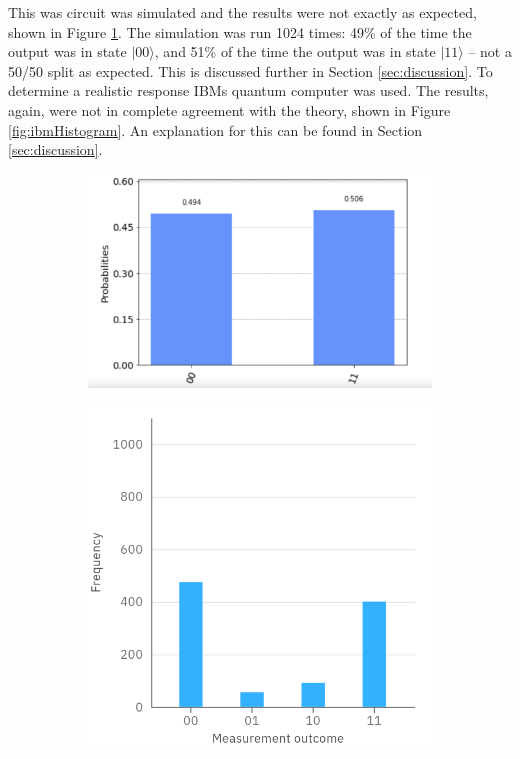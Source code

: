 This was circuit was simulated and the results were not exactly as expected, shown in Figure \ref{fig:qiskitHistogram}. The simulation was run 1024 times: 49\% of the time the output was in state $|00\rangle$, and 51\% of the time the output was in state $|11\rangle$ -- not a 50/50 split as expected. This is discussed further in Section \ref{sec:discussion}. To determine a realistic response IBMs quantum computer was used. The results, again, were not in complete agreement with the theory, shown in Figure \ref{fig:ibmHistogram}. An explanation for this can be found in Section \ref{sec:discussion}.

\begin{figure}[h]
    \centering
    \begin{subfigure}[h]{0.5\textwidth}
        \includegraphics[width=\textwidth]{lab2/images/qiskitHistogram.png}
        \caption{} 
        \label{fig:qiskitHistogram}
    \end{subfigure}
    \hfill
    \begin{subfigure}[h]{0.43\textwidth}
        \includegraphics[width=\textwidth]{lab2/images/ibmHistogram.png}

\end{subfigure}
\end{figure}
